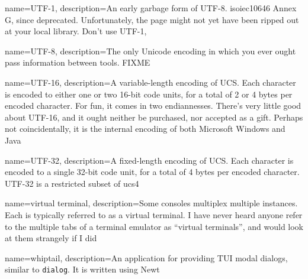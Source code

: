 {
  name={UTF-1},
description={An early garbage form of UTF-8. \Gls{isoiec10646} Annex G, since deprecated.
  Unfortunately, the page might not yet have been ripped out at your local
  library. Don't use UTF-1},
}

{
  name={UTF-8},
description={The only Unicode encoding in which you ever ought pass information
  between tools\cite{utf8everywhere}. FIXME}
}

{
  name={UTF-16},
description={A variable-length encoding of UCS. Each character is encoded to
  either one or two 16-bit code units, for a total of 2 or 4 bytes per
  encoded character. For fun, it comes in two endiannesses. There's very little
  good about UTF-16, and it ought neither be purchased, nor accepted as a gift.
  Perhaps not coincidentally, it is the internal encoding of both Microsoft
  Windows and Java}
}

{
  name={UTF-32},
description={A fixed-length encoding of UCS. Each character is encoded to a
  single 32-bit code unit, for a total of 4 bytes per encoded character. UTF-32
  is a restricted subset of \Gls{ucs4}\cite{rfc3629}}
}

{
  name={virtual terminal},
description={Some consoles multiplex multiple instances. Each is
  typically referred to as a virtual terminal. I have never heard anyone
  refer to the multiple tabs of a terminal emulator as ``virtual terminals'',
  and would look at them strangely if I did}
}

{
  name={whiptail},
description={An application for providing TUI modal dialogs, similar to \texttt{dialog}. It is written using Newt}
}

